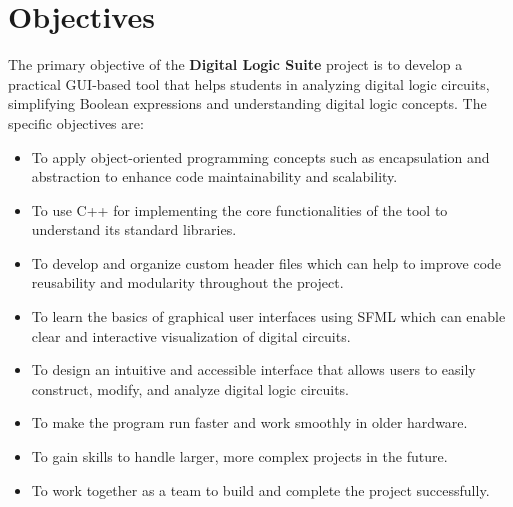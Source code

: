 \section{Objectives}

The primary objective of the \textbf{Digital Logic Suite} project is to develop a practical GUI-based tool that helps students in analyzing digital logic circuits, simplifying Boolean expressions and understanding digital logic concepts. The specific objectives are:

\begin{itemize}[label=\textbullet]
      \item To apply object-oriented programming concepts such as encapsulation and abstraction to enhance code maintainability and scalability.

      \item To use C++ for implementing the core functionalities of the tool to understand its standard libraries.

      \item To develop and organize custom header files which can help to improve code reusability and modularity throughout the project.

      \item To learn the basics of graphical user interfaces using SFML which can enable clear and interactive visualization of digital circuits.

      \item To design an intuitive and accessible interface that allows users to easily construct, modify, and analyze digital logic circuits.

      \item To make the program run faster and work smoothly in older hardware.

      \item To gain skills to handle larger, more complex projects in the future.

      \item To work together as a team to build and complete the project successfully.

\end{itemize}
\clearpage